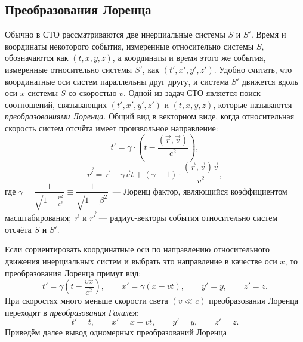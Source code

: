 \subsection{Преобразования Лоренца}
Обычно в СТО рассматриваются две инерциальные системы $S$ и $S'$. Время и координаты некоторого события, измеренные относительно системы $S$, обозначаются как $(t, x, y, z)$, а координаты и время этого же события, измеренные относительно системы $S'$, как $(t', x', y', z')$. Удобно считать, что координатные оси систем параллельны друг другу, и система $S'$ движется вдоль оси $x$ системы $S$ со скоростью $v$. Одной из задач СТО является поиск соотношений, связывающих $(t', x', y', z')$ и $(t, x, y, z)$, которые называются \textit{преобразованиями Лоренца}. Общий вид  в векторном виде, когда относительная скорость систем отсчёта имеет произвольное направление:
\begin{equation}
	t'=\gamma\cdot \left(t-\frac{(\vec{r},\vec{v})}{c^2}\right),
\end{equation}
\begin{equation}
	\vec{r'} = \vec{r} - \gamma \vec{v} t + (\gamma - 1) \cdot \frac{(\vec{r},\vec{v})\vec{v}}{v^2},
\end{equation}
где  $\gamma = \dfrac{1}{\sqrt{1 - \frac{v^2}{c^2}}} \equiv \dfrac{1}{\sqrt{1-\beta^2}}$~--- Лоренц фактор, являющийся коэффициентом масштабирования; $\vec{r}$ и $\vec{r'}$ --- радиус-векторы события относительно систем отсчёта $S$ и $S'$.

Если сориентировать координатные оси по направлению относительного движения инерциальных систем и выбрать это направление в качестве оси $x$, то преобразования Лоренца примут вид:
\begin{equation}
	t'=\gamma \left(t - \frac{v x}{c^2} \right),\quad\quad x'= \gamma \left( x-vt \right), \quad\quad y'=y,\quad\quad z'=z.
\end{equation}
При скоростях много меньше скорости света $(v\ll c)$ преобразования Лоренца переходят в \textit{преобразования Галилея}:
\begin{equation}
	t'=t,\quad\quad x'=x-vt,\quad\quad  y'=y,\quad\quad  z'=z.
\end{equation}
Приведём далее вывод одномерных преобразований Лоренца


